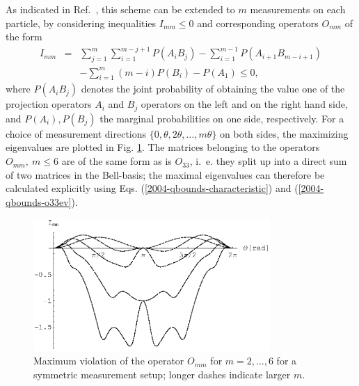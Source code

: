 \documentclass[prl,showpacs,showkeys,amsfonts,amsmath,twocolumn]{revtex4}
\begin{document}
As indicated in Ref.~\cite{collins-gisin-2003}, this scheme can be extended to $m$
measurements on each particle, by considering inequalities $I_{mm}
\leq 0$ and
corresponding operators $O_{mm}$ of the form
\begin{eqnarray}
  I_{mm}&=& \sum_{j=1}^{m}\sum_{i=1}^{m-j+1}P({A_i B_j})-\sum_{i=1}^{m-1}
  P({A_{i+1}B_{m-i+1}}) \nonumber\\
  &&-\sum_{i=1}^{m}(m-i)P(B_{i}) - P(A_1) \leq 0,
\end{eqnarray}
where $P(A_i B_j)$ denotes the joint probability of obtaining the value one of the
projection operators $A_i$ and $B_j$ operators on the left and on the
right hand side, and $P(A_i), P(B_j)$ the marginal probabilities on
one side, respectively.
For a choice of measurement directions
$\{0,\theta,2\theta,\ldots,m\theta\}$ on both sides,
the maximizing eigenvalues
are plotted in Fig. \ref{fig:2004-qbounds-f2}.
The matrices belonging to the operators $O_{mm},\ m \leq
6$
are of the same form
as is $O_{33}$, i.~e. they
split up into a direct sum of two matrices in the
Bell-basis; the maximal eigenvalues can therefore be  calculated
explicitly using Eqs. (\ref{2004-qbounds-characteristic}) and (\ref{2004-qbounds-o33ev}).
\begin{figure}[htbp]
  \centering
  \includegraphics[width=90mm]{2004-qbounds-f2}
  \caption{Maximum violation of the operator $O_{mm}$ for
    $m=2,\ldots,6$ for a symmetric measurement setup; longer dashes indicate larger $m$.}
  \label{fig:2004-qbounds-f2}
\end{figure}





\end{document}

